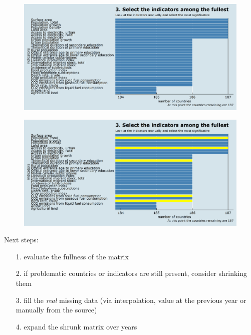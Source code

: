 \documentclass[9pt]{beamer}
\begin{document}
\begin{frame}
\begin{figure}
\centering
\includegraphics[width=\textwidth]{plot0006.png}
\end{figure}
\end{frame}

\begin{frame}
\begin{figure}
\centering
\includegraphics[width=\textwidth]{plot0007.png}
\end{figure}
\end{frame}

\begin{frame}
Next steps:
\begin{itemize} [<+->]
	\item[1.] evaluate the fullness of the matrix
	\item[2.] if problematic countries or indicators are still present, consider shrinking them
	\item[3.] fill the \textit{real} missing data (via interpolation, value at the previous year or manually from the source)
	\item[4.] expand the shrunk matrix over years 
\end{itemize}
\end{frame}
\end{document}
